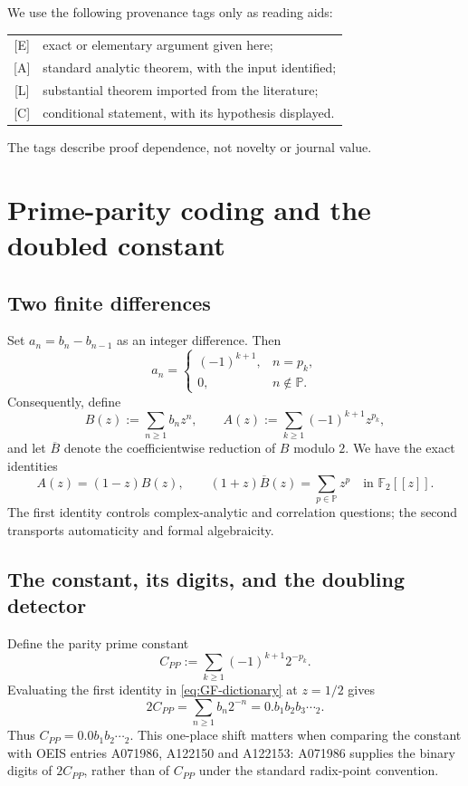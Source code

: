 \documentclass[11pt]{article}
\theoremstyle{definition}
\theoremstyle{remark}
\newcommand{\PP}{\mathbb P}
\newcommand{\Ftwo}{\mathbb F_{2}}
\newcommand{\status}[1]{\textnormal{\textcolor{accent}{\footnotesize[#1]}}}
\begin{document}
We use the following provenance tags only as reading aids:
\begin{center}
\begin{tabular}{@{}cl@{}}
\toprule
\status{E} & exact or elementary argument given here;\\
\status{A} & standard analytic theorem, with the input identified;\\
\status{L} & substantial theorem imported from the literature;\\
\status{C} & conditional statement, with its hypothesis displayed.\\
\bottomrule
\end{tabular}
\end{center}
The tags describe proof dependence, not novelty or journal value.

\section{Prime-parity coding and the doubled constant}

\subsection{Two finite differences}

Set $a_n=b_n-b_{n-1}$ as an integer difference.  Then
\begin{equation}\label{eq:signed-prime-difference}
 a_n=
 \begin{cases}
   (-1)^{k+1},&n=p_k,\\
   0,&n\notin\PP.
 \end{cases}
\end{equation}
Consequently, define
\[
 B(z):=\sum_{n\ge1}b_nz^n,
 \qquad A(z):=\sum_{k\ge1}(-1)^{k+1}z^{p_k},
\]
and let $\overline B$ denote the coefficientwise reduction of $B$ modulo $2$.  We have
the exact identities
\begin{equation}\label{eq:GF-dictionary}
 A(z)=(1-z)B(z),
 \qquad
 (1+z)\overline B(z)=\sum_{p\in\PP}z^p
 \quad\text{in }\Ftwo[[z]].
\end{equation}
The first identity controls complex-analytic and correlation questions; the second
transports automaticity and formal algebraicity.

\subsection{The constant, its digits, and the doubling detector}

Define the parity prime constant
\begin{equation}\label{eq:CPP-def}
 C_{PP}:=\sum_{k\ge1}(-1)^{k+1}2^{-p_k}.
\end{equation}
Evaluating the first identity in \eqref{eq:GF-dictionary} at $z=1/2$ gives
\begin{equation}\label{eq:2CPP-binary}
 2C_{PP}=\sum_{n\ge1}b_n2^{-n}=0.b_1b_2b_3\cdots{}_2.
\end{equation}
Thus $C_{PP}=0.0b_1b_2\cdots{}_2$.  This one-place shift matters when comparing the
constant with OEIS entries A071986, A122150 and A122153: A071986 supplies the binary
digits of $2C_{PP}$, rather than of $C_{PP}$ under the standard radix-point convention.
\end{document}

